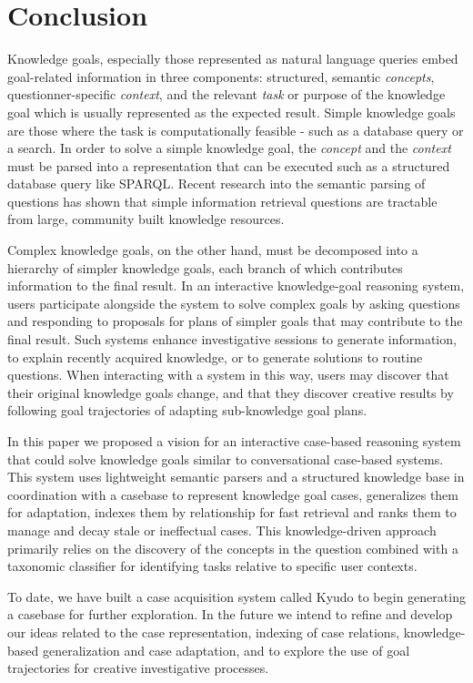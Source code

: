 \documentclass[11pt,letterpaper]{article}
\begin{document}
\section{Conclusion}

Knowledge goals, especially those represented as natural language queries embed goal-related information in three components: structured, semantic \textit{concepts}, questionner-specific \textit{context}, and the relevant \textit{task} or purpose of the knowledge goal which is usually represented as the expected result. Simple knowledge goals are those where the task is computationally feasible - such as a database query or a search. In order to solve a simple knowledge goal, the \textit{concept} and the \textit{context} must be parsed into a representation that can be executed such as a structured database query like SPARQL. Recent research into the semantic parsing of questions has shown that simple information retrieval questions are tractable from large, community built knowledge resources.

Complex knowledge goals, on the other hand, must be decomposed into a hierarchy of simpler knowledge goals, each branch of which contributes information to the final result. In an interactive knowledge-goal reasoning system, users participate alongside the system to solve complex goals by asking questions and responding to proposals for plans of simpler goals that may contribute to the final result. Such systems enhance investigative sessions to generate information, to explain recently acquired knowledge, or to generate solutions to routine questions. When interacting with a system in this way, users may discover that their original knowledge goals change, and that they discover creative results by following goal trajectories of adapting sub-knowledge goal plans.

In this paper we proposed a vision for an interactive case-based reasoning system that could solve knowledge goals similar to conversational case-based systems. This system uses lightweight semantic parsers and a structured knowledge base in coordination with a casebase to represent knowledge goal cases, generalizes them for adaptation, indexes them by relationship for fast retrieval and ranks them to manage and decay stale or ineffectual cases. This knowledge-driven approach primarily relies on the discovery of the concepts in the question combined with a taxonomic classifier for identifying tasks relative to specific user contexts.

To date, we have built a case acquisition system called Kyudo to begin generating a casebase for further exploration. In the future we intend to refine and develop our ideas related to the case representation, indexing of case relations, knowledge-based generalization and case adaptation, and to explore the use of goal trajectories for creative investigative processes.
\end{document}
